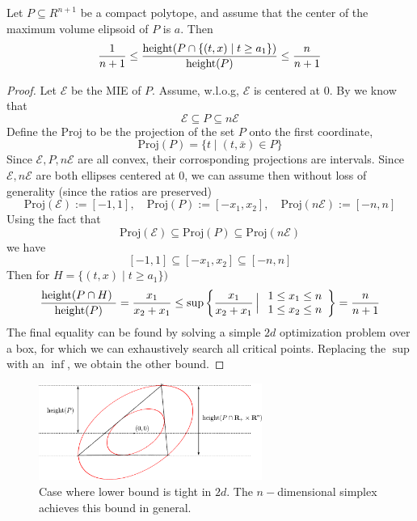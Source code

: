 \begin{lem}\label{lem:MIE-1D-Div}
Let $P\subseteq R^{n+1}$ be a compact polytope, and assume that the
center of the maximum volume elipsoid of $P$ is $a$. Then
\[ 
\frac{1}{n+1}\leq
\frac{\mbox{\rm height}
(\ensuremath{P\cap \{(t,x)\mid t\geq a_1\})}}{\mbox{\rm height(\ensuremath{P})}}
\leq\frac{n}{n+1}
\]
\end{lem}
\begin{proof}
Let $\mathcal{E}$ be the MIE of $P$. Assume, w.l.o.g, $\mathcal{E}$ is centered at $0$. By \cite{tarasov1988method} we know that
\[
\mathcal{E}\subseteq P\subseteq n \mathcal{E}
\]
Define the $\mbox{Proj}$ to be the projection of the set $P$ onto
the first coordinate,
\[
\mbox{Proj}(P)=\{t\mid(t,\bar{x})\in P\mbox{\}}
\]
Since $\mathcal{E},P,n \mathcal{E}$ are all convex, their corrosponding projections are
intervals. Since $\mathcal{E},n \mathcal{E}$ are both ellipses centered at $0$, we can
assume then without loss of generality (since the ratios are preserved)
\[
\mbox{Proj}(\mathcal{E}):=[-1,1],\quad\mbox{Proj}(P):=[-x_1,x_2],\quad\mbox{Proj}(n \mathcal{E}):=[-n,n]
\]
Using the fact that 
\[
\mbox{Proj}(\mathcal{E})\subseteq\mbox{Proj}(P)\subseteq\mbox{Proj}(n \mathcal{E})
\]
we have
\[
[-1,1]\subseteq[-x_1,x_2]\subseteq[-n,n]
\]
Then for $H = \{(t,x)\mid t\geq a_1\})$
\[
\frac{\mbox{height(\ensuremath{P\cap H)} }}{\mbox{height(\ensuremath{P})}}=\frac{x_1}{x_2+x_1}\leq\sup\left\{ \frac{x_1}{x_2+x_1}\,\Big|\;\begin{array}{c}
1\leq x_1\leq n\\
1\leq x_2\leq n
\end{array}\right\} =\frac{n}{n+1}
\]
The final equality can be found by solving a simple $2d$ optimization
problem over a box, for which we can exhaustively search all critical
points. Replacing the $\sup$ with an $\inf$, we obtain the other bound.
\end{proof}

\begin{figure}
\begin{centering}
\includegraphics[width=0.65\textwidth]{cutting/fig1}
\par\end{centering}
\caption{Case where lower bound is tight in $2d$. The $n-$dimensional simplex
achieves this bound in general.}

\end{figure}

